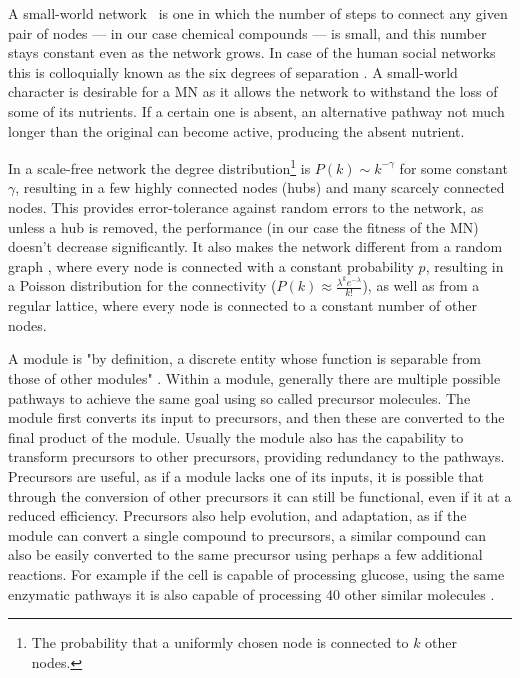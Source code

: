 \documentclass[a4paper,12pt]{article}
\begin{document}
	A small-world network \cite{smallworld}~is one in which the number of steps to connect any given pair of nodes --- in our case chemical compounds --- is small, and this number stays constant even as the network grows. In case of the human social networks this is colloquially known as the six degrees of separation \cite{sixdegrees}. A small-world character is desirable for a MN as it allows the network to withstand the loss of some of its nutrients. If a certain one is absent, an alternative pathway not much longer than the original can become active, producing the absent nutrient. %
	 
	In a scale-free network the degree distribution\footnote{The probability that a uniformly chosen node is connected to $k$ other nodes.} is $P(k)\sim k^{-\gamma}$ for some constant $\gamma$, resulting in a few highly connected nodes (hubs) and many scarcely connected nodes. This provides error-tolerance against random errors to the network, as unless a hub is removed, the performance (in our case the fitness of the MN) doesn't decrease significantly. It also makes the network different from a random graph \cite{randomgraphs}, where every node is connected with a constant probability $p$, resulting in a Poisson distribution for the connectivity ($P(k) \approx \frac{\lambda^k e^{-\lambda}}{k!} $), as well as from a regular lattice, where every node is connected to a constant number of other nodes.
	 
	A module is "by definition, a discrete entity whose function is separable from those of other modules" \cite{modulardef}. Within a module, generally there are multiple possible pathways to achieve the same goal using so called precursor molecules. The module first converts its input to precursors, and then these are converted to the final product of the module. Usually the module also has the capability to transform precursors to other precursors, providing redundancy to the pathways. Precursors are useful, as if a module lacks one of its inputs, it is possible that through the conversion of other precursors it can still be functional, even if it at a reduced efficiency. Precursors also help evolution, and adaptation, as if the module can convert a single compound to precursors, a similar compound can also be easily converted to the same precursor using perhaps a few additional reactions. For example if the cell is capable of processing glucose, using the same enzymatic pathways it is also capable of processing 40 other similar molecules \cite{latent}.
	
\end{document}
